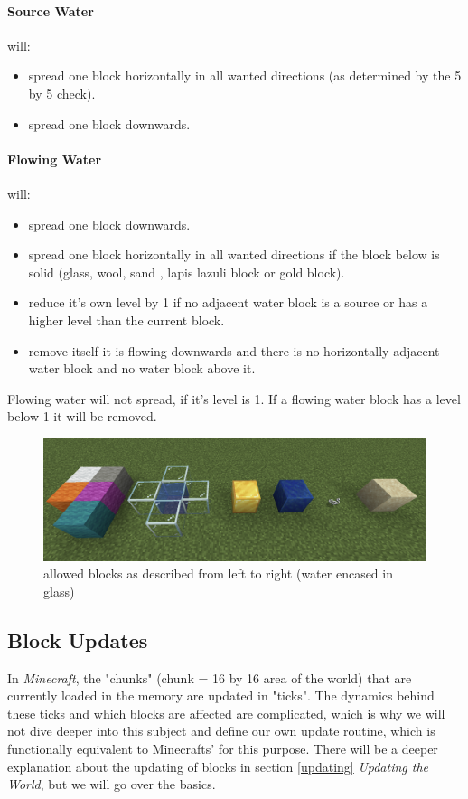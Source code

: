 \paragraph{Source Water} will:
\begin{itemize}
    \item spread one block horizontally in all wanted directions (as determined by the 5 by 5 check).
    \item spread one block downwards.
\end{itemize}

\paragraph{Flowing Water} will:
\begin{itemize}
    \item spread one block downwards.
    \item spread one block horizontally in all wanted directions if the block below is solid (glass, wool, sand , lapis lazuli block or gold block).
    \item reduce it's own level by 1 if no adjacent water block is a source or has a higher level than the current block.
    \item remove itself it is flowing downwards and there is no horizontally adjacent water block and no water block above it.
\end{itemize}
Flowing water will not spread, if it's level is 1. If a flowing water block has a level below 1 it will be removed.

\begin{figure}[h]
    \centering
    \includegraphics[width=\linewidth]{images/allowed blocks.png}
    \caption{allowed blocks as described from left to right (water encased in glass)}
    \label{fig:allowedblocks}
\end{figure}


\vspace{2cm}

\subsection{Block Updates} \label{blockupdates}
\noindent In \textit{Minecraft}, the "chunks" (chunk = 16 by 16 area of the world) that are currently loaded in the memory are updated in "ticks". The dynamics behind these ticks and which blocks are affected are complicated, which is why we will not dive deeper into this subject and define our own update routine, which is functionally equivalent to Minecrafts' for this purpose. There will be a deeper explanation about the updating of blocks in section \ref{updating} \textit{Updating the World}, but we will go over the basics. 


